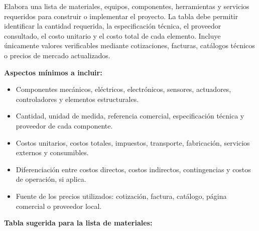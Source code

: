 \documentclass[12pt,letterpaper]{report}
\begin{document}
\begin{instrucciones}
Elabora una lista de materiales, equipos, componentes, herramientas y servicios requeridos para construir o implementar el proyecto. La tabla debe permitir identificar la cantidad requerida, la especificación técnica, el proveedor consultado, el costo unitario y el costo total de cada elemento. Incluye únicamente valores verificables mediante cotizaciones, facturas, catálogos técnicos o precios de mercado actualizados.

\vspace{2mm}
\noindent \textbf{Aspectos mínimos a incluir:}
\begin{itemize}
  \item Componentes mecánicos, eléctricos, electrónicos, sensores, actuadores, controladores y elementos estructurales.
  \item Cantidad, unidad de medida, referencia comercial, especificación técnica y proveedor de cada componente.
  \item Costos unitarios, costos totales, impuestos, transporte, fabricación, servicios externos y consumibles.
  \item Diferenciación entre costos directos, costos indirectos, contingencias y costos de operación, si aplica.
  \item Fuente de los precios utilizados: cotización, factura, catálogo, página comercial o proveedor local.
\end{itemize}

\vspace{2mm}
\noindent \textbf{Tabla sugerida para la lista de materiales:}


\end{instrucciones}
\end{document}
